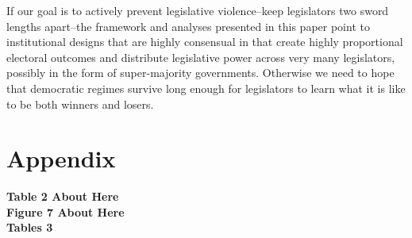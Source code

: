 \documentclass[a4paper]{article}\usepackage{graphicx, color}
\begin{document}
If our goal is to actively prevent legislative violence--keep legislators two sword lengths apart--the framework and analyses presented in this paper point to institutional designs that are highly consensual in that create highly proportional electoral outcomes and distribute legislative power across very many legislators, possibly in the form of super-majority governments. Otherwise we need to hope that democratic regimes survive long enough for legislators to learn what it is like to be both winners and losers.


\section*{Appendix}

\begin{center}

    {\bf{Table 2 About Here}} \\
    {\bf{Figure 7 About Here}} \\
    {\bf{Tables 3}}

\end{center}







\theendnotes













\end{document}
